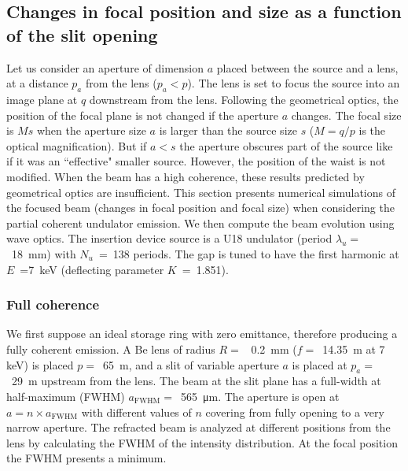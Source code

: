 \documentclass{iucr}              %
\begin{document}
 
 \subsection{Changes in focal position and size as a function of the slit opening}
 
Let us consider an aperture of dimension $a$ placed between the source and a lens, at a distance $p_a$ from the lens ($p_a < p$). The lens is set to focus the source into an image plane at $q$ downstream from the lens. Following the geometrical optics, the position of the focal plane is not changed if the aperture $a$ changes. The focal size is $Ms$  when the aperture size $a$ is larger than the source size $s$ ($M=q/p$ is the optical magnification). But if $a<s$ the aperture obscures part of the source like if it was an ``effective" smaller source. However, the position of the waist is not modified. When the beam has a high coherence, these results predicted by geometrical optics are insufficient. This section presents numerical simulations of the focused beam (changes in focal position and focal size) when considering the partial coherent undulator emission. 
We then compute the beam evolution using wave optics. The insertion device source is a U18 undulator (period $\lambda_u=$~\SI{18}{\milli\meter}) with $N_u$~=~138 periods. The gap is tuned to have the first harmonic at $E$~=7~keV (deflecting parameter $K$~=~1.851). 

\subsubsection{Full coherence} We first suppose an ideal storage ring with zero emittance, therefore producing a fully coherent emission. A Be lens of radius $R=$~ \SI{0.2}{\milli\meter} ($f=$~\SI{14.35}{\meter} at 7 keV) is placed $p=$~\SI{65}{\meter}, and a slit of variable aperture $a$ is placed at $p_a=$~\SI{29}{\meter} upstream from the lens. The beam at the slit plane has a full-width at half-maximum (FWHM) $a_\text{FWHM}=$~\SI{565}{\micro\meter}. The aperture is open at $a=n \times a_\text{FWHM}$ with different values of $n$ covering from fully opening to a very narrow aperture. The refracted beam is analyzed at different positions from the lens by calculating the FWHM of the intensity distribution. At the focal position the FWHM presents a minimum. 
\end{document}
